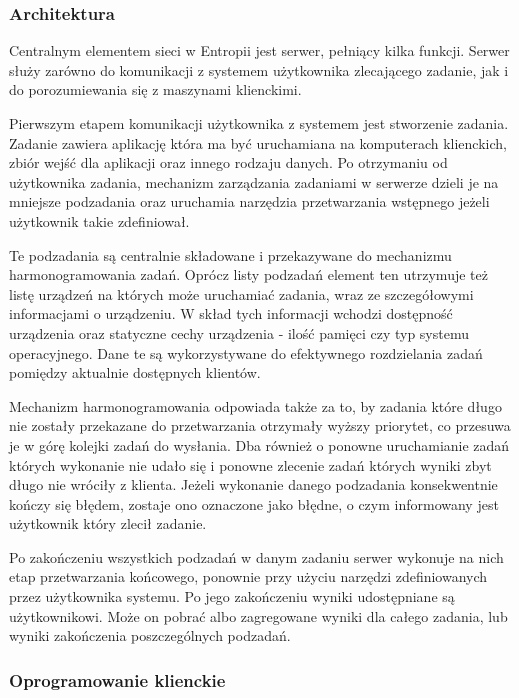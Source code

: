 \documentclass[12pt,a4paper,twoside]{article}
\begin{document}
\subsubsection{Architektura}

Centralnym elementem sieci w Entropii jest serwer, pełniący kilka funkcji. Serwer służy zarówno do komunikacji z systemem użytkownika zlecającego zadanie, jak i do porozumiewania się z maszynami klienckimi.

Pierwszym etapem komunikacji użytkownika z systemem jest stworzenie zadania. Zadanie zawiera aplikację która ma być uruchamiana na komputerach klienckich, zbiór wejść dla aplikacji oraz innego rodzaju danych. Po otrzymaniu od użytkownika zadania, mechanizm zarządzania zadaniami w serwerze dzieli je na mniejsze podzadania oraz uruchamia narzędzia przetwarzania wstępnego jeżeli użytkownik takie zdefiniował. 

Te podzadania są centralnie składowane i przekazywane do mechanizmu harmonogramowania zadań. Oprócz listy podzadań element ten utrzymuje też listę urządzeń na których może uruchamiać zadania, wraz ze szczegółowymi informacjami o urządzeniu. W skład tych informacji wchodzi dostępność urządzenia oraz statyczne cechy urządzenia - ilość pamięci czy typ systemu operacyjnego. Dane te są wykorzystywane do efektywnego rozdzielania zadań pomiędzy aktualnie dostępnych klientów.

Mechanizm harmonogramowania odpowiada także za to, by zadania które długo nie zostały przekazane do przetwarzania otrzymały wyższy priorytet, co przesuwa je w górę kolejki zadań do wysłania. Dba również o ponowne uruchamianie zadań których wykonanie nie udało się i ponowne zlecenie zadań których wyniki zbyt długo nie wróciły z klienta. Jeżeli wykonanie danego podzadania konsekwentnie kończy się błędem, zostaje ono oznaczone jako błędne, o czym informowany jest użytkownik który zlecił zadanie.

Po zakończeniu wszystkich podzadań w danym zadaniu serwer wykonuje na nich etap przetwarzania końcowego, ponownie przy użyciu narzędzi zdefiniowanych przez użytkownika systemu. Po jego zakończeniu wyniki udostępniane są użytkownikowi. Może on pobrać albo zagregowane wyniki dla całego zadania, lub wyniki zakończenia poszczególnych podzadań.

\subsubsection{Oprogramowanie klienckie}
\end{document}
